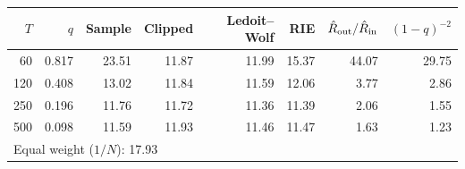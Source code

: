 \begin{tabular}{rrrrrrrr}
\toprule
$T$ & $q$ & Sample & Clipped & Ledoit--Wolf & RIE & $\hat R_{\rm out}/\hat R_{\rm in}$ & $(1-q)^{-2}$\\
\midrule
60 & 0.817 & 23.51 & 11.87 & 11.99 & 15.37 & 44.07 & 29.75 \\
120 & 0.408 & 13.02 & 11.84 & 11.59 & 12.06 & 3.77 & 2.86 \\
250 & 0.196 & 11.76 & 11.72 & 11.36 & 11.39 & 2.06 & 1.55 \\
500 & 0.098 & 11.59 & 11.93 & 11.46 & 11.47 & 1.63 & 1.23 \\
\midrule
\multicolumn{8}{l}{Equal weight ($1/N$): 17.93}\\
\bottomrule
\end{tabular}
